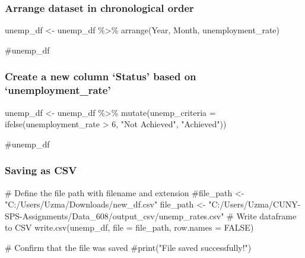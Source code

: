 \documentclass[
  letterpaper,
  DIV=11,
  numbers=noendperiod]{scrartcl}
\newenvironment{Shaded}{\begin{snugshade}}{\end{snugshade}}
\newcommand{\AttributeTok}[1]{\textcolor[rgb]{0.40,0.45,0.13}{#1}}
\newcommand{\CommentTok}[1]{\textcolor[rgb]{0.37,0.37,0.37}{#1}}
\newcommand{\ConstantTok}[1]{\textcolor[rgb]{0.56,0.35,0.01}{#1}}
\newcommand{\DecValTok}[1]{\textcolor[rgb]{0.68,0.00,0.00}{#1}}
\newcommand{\FunctionTok}[1]{\textcolor[rgb]{0.28,0.35,0.67}{#1}}
\newcommand{\NormalTok}[1]{\textcolor[rgb]{0.00,0.23,0.31}{#1}}
\newcommand{\OtherTok}[1]{\textcolor[rgb]{0.00,0.23,0.31}{#1}}
\newcommand{\SpecialCharTok}[1]{\textcolor[rgb]{0.37,0.37,0.37}{#1}}
\newcommand{\StringTok}[1]{\textcolor[rgb]{0.13,0.47,0.30}{#1}}
\begin{document}
\subsubsection{Arrange dataset in chronological
order}\label{arrange-dataset-in-chronological-order}

\begin{Shaded}
\begin{Highlighting}[]
\NormalTok{unemp\_df }\OtherTok{\textless{}{-}}\NormalTok{ unemp\_df }\SpecialCharTok{\%\textgreater{}\%}
  \FunctionTok{arrange}\NormalTok{(Year, Month, unemployment\_rate)}

\CommentTok{\#unemp\_df}
\end{Highlighting}
\end{Shaded}

\subsubsection{Create a new column `Status' based on
`unemployment\_rate'}\label{create-a-new-column-status-based-on-unemployment_rate}

\begin{Shaded}
\begin{Highlighting}[]
\NormalTok{unemp\_df }\OtherTok{\textless{}{-}}\NormalTok{ unemp\_df }\SpecialCharTok{\%\textgreater{}\%}
  \FunctionTok{mutate}\NormalTok{(}\AttributeTok{unemp\_criteria =} \FunctionTok{ifelse}\NormalTok{(unemployment\_rate }\SpecialCharTok{\textgreater{}} \DecValTok{6}\NormalTok{, }\StringTok{"Not Achieved"}\NormalTok{, }\StringTok{"Achieved"}\NormalTok{))}

\CommentTok{\#unemp\_df}
\end{Highlighting}
\end{Shaded}

\subsubsection{Saving as CSV}\label{saving-as-csv-3}

\begin{Shaded}
\begin{Highlighting}[]
\CommentTok{\# Define the file path with filename and extension}
\CommentTok{\#file\_path \textless{}{-} "C:/Users/Uzma/Downloads/new\_df.csv"}
\NormalTok{file\_path }\OtherTok{\textless{}{-}} \StringTok{"C:/Users/Uzma/CUNY{-}SPS{-}Assignments/Data\_608/output\_csv/unemp\_rates.csv"}
\CommentTok{\# Write dataframe to CSV}
\FunctionTok{write.csv}\NormalTok{(unemp\_df, }\AttributeTok{file =}\NormalTok{ file\_path, }\AttributeTok{row.names =} \ConstantTok{FALSE}\NormalTok{)}

\CommentTok{\# Confirm that the file was saved}
\CommentTok{\#print("File saved successfully!")}
\end{Highlighting}
\end{Shaded}
\end{document}
